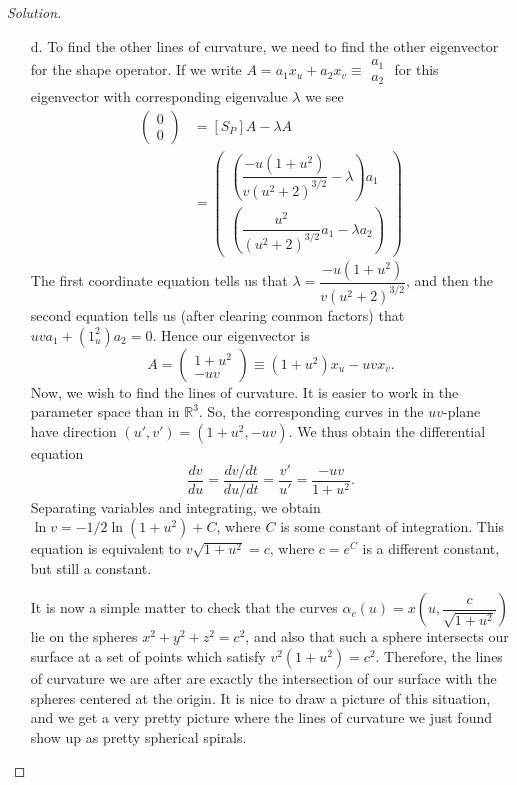 \documentclass[Shifrin_Solutions_Spring_2018]{subfiles}
\begin{document}
\begin{proof}[Solution]
\begin{itemize}
\item[d.] To find the other lines of curvature, we need to find the other eigenvector for the shape operator. If we write $A = a_1 x_u + a_2 x_v \equiv \begin{smallmatrix} a_1 \\ a_2 \end{smallmatrix}$ for this eigenvector with corresponding eigenvalue $\lambda$ we see
\[
\begin{split}
\begin{pmatrix}0\\0\end{pmatrix} & = \left[ S_P\right] A -\lambda A \\
	& = \begin{pmatrix} \left(\dfrac{-u(1+u^2)}{v(u^2+2)^{3/2}}- \lambda \right)a_1 \\ \left(\dfrac{u^2}{(u^2+2)^{3/2}} a_1 - \lambda a_2\right) \end{pmatrix}
\end{split}
\]
The first coordinate equation tells us that $\lambda = \dfrac{-u(1+u^2)}{v(u^2+2)^{3/2}}$, and then the second equation tells us (after clearing common factors) that $uv a_1 + (1_u^2)a_2 = 0$. Hence our eigenvector is
\[
A = \begin{pmatrix} 1+u^2 \\ -uv \end{pmatrix} \equiv (1+u^2)x_u - uv x_v .
\]
Now, we wish to find the lines of curvature. It is easier to work in the parameter space than in $\mathbb{R}^3$. So, the corresponding curves in the $uv$-plane have direction $(u', v') = (1+u^2, -uv)$. We thus obtain the differential equation
\[
\dfrac{dv}{du} = \dfrac{dv/dt}{du/dt} = \dfrac{v'}{u'} = \dfrac{-uv}{1+u^2} .
\]
Separating variables and integrating, we obtain $\ln v = -1/2 \ln (1+u^2) + C$, where $C$ is some constant of integration. This equation is equivalent to $v\sqrt{1+u^2} = c$, where $c=e^C$ is a different constant, but still a constant.

It is now a simple matter to check that the curves $\alpha_c(u) = x\left(u, \dfrac{c}{\sqrt{1+u^2}}\right)$ lie on the spheres $x^2+y^2+z^2=c^2$, and also that such a sphere intersects our surface at a set of points which satisfy $v^2(1+u^2)  = c^2$. Therefore, the lines of curvature we are after are exactly the intersection of our surface with the spheres centered at the origin. It is nice to draw a picture of this situation, and we get a very pretty picture where the lines of curvature we just found show up as pretty spherical spirals.


\end{itemize}
\end{proof}
\end{document}
